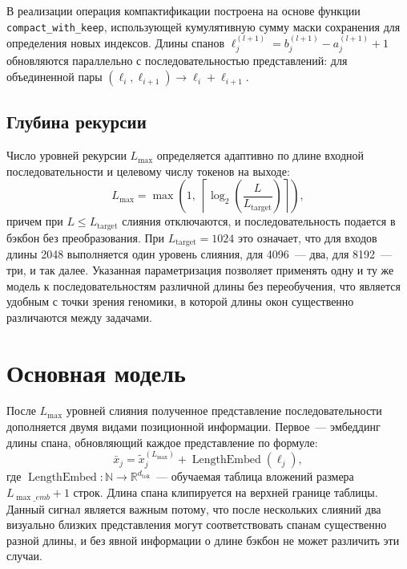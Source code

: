 В реализации операция компактификации построена на основе функции
\texttt{compact\_with\_keep}, использующей кумулятивную сумму маски
сохранения для определения новых индексов. Длины спанов $\ell_j^{(l+1)}
= b_j^{(l+1)} - a_j^{(l+1)} + 1$ обновляются параллельно с
последовательностью представлений: для объединенной пары
$(\ell_i, \ell_{i+1}) \to \ell_i + \ell_{i+1}$.

\subsection{Глубина рекурсии}

Число уровней рекурсии $L_{\max}$ определяется адаптивно по длине
входной последовательности и целевому числу токенов на выходе:
\begin{equation}
  L_{\max} = \max\!\left(1,\; \left\lceil \log_2\!\left(\frac{L}{L_{\text{target}}}\right) \right\rceil\right),
  \label{eq:depth}
\end{equation}
причем при $L \leq L_{\text{target}}$ слияния отключаются, и
последовательность подается в бэкбон без преобразования. При
$L_{\text{target}} = 1024$ это означает, что для входов длины 2048
выполняется один уровень слияния, для 4096~--- два, для 8192~--- три,
и так далее. Указанная параметризация позволяет применять одну и ту же
модель к последовательностям различной длины без переобучения, что
является удобным с точки зрения геномики, в которой длины окон
существенно различаются между задачами.

\section{Основная модель}

После $L_{\max}$ уровней слияния полученное представление
последовательности дополняется двумя видами позиционной информации.
Первое~--- эмбеддинг длины спана, обновляющий каждое представление по
формуле:
\begin{equation}
  \bar x_j = \tilde x_j^{(L_{\max})} + \operatorname{LengthEmbed}(\ell_j),
  \label{eq:length_emb}
\end{equation}
где $\operatorname{LengthEmbed}: \mathbb{N} \to \mathbb{R}^{d_{\text{tok}}}$~---
обучаемая таблица вложений размера $L_{\max\_emb} + 1$ строк. Длина
спана клипируется на верхней границе таблицы. Данный сигнал является
важным потому, что после нескольких слияний два визуально близких
представления могут соответствовать спанам существенно разной длины, и
без явной информации о длине бэкбон не может различить эти случаи.

